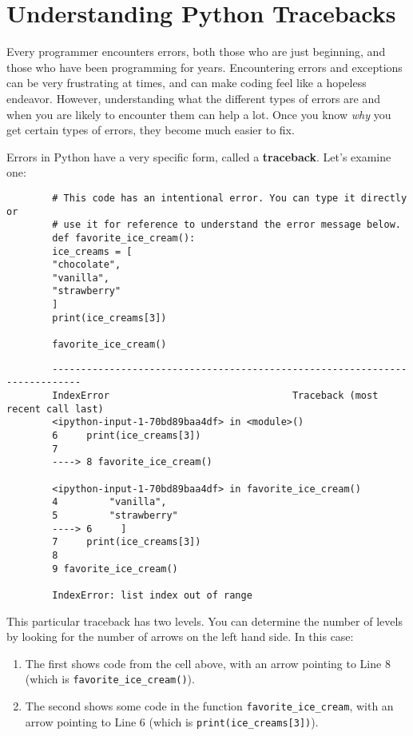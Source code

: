 \documentclass{article}
\begin{document}
	
	\section{Understanding Python Tracebacks}
	
	Every programmer encounters errors, both those who are just beginning, and those who have been programming for years. Encountering errors and exceptions can be very frustrating at times, and can make coding feel like a hopeless endeavor. However, understanding what the different types of errors are and when you are likely to encounter them can help a lot. Once you know \textit{why} you get certain types of errors, they become much easier to fix.
	
	Errors in Python have a very specific form, called a \textbf{traceback}. Let's examine one:
	
	\begin{verbatim}
		# This code has an intentional error. You can type it directly or
		# use it for reference to understand the error message below.
		def favorite_ice_cream():
		ice_creams = [
		"chocolate",
		"vanilla",
		"strawberry"
		]
		print(ice_creams[3])
		
		favorite_ice_cream()
	\end{verbatim}
	
	\begin{verbatim}
		---------------------------------------------------------------------------
		IndexError                                Traceback (most recent call last)
		<ipython-input-1-70bd89baa4df> in <module>()
		6     print(ice_creams[3])
		7
		----> 8 favorite_ice_cream()
		
		<ipython-input-1-70bd89baa4df> in favorite_ice_cream()
		4         "vanilla",
		5         "strawberry"
		----> 6     ]
		7     print(ice_creams[3])
		8
		9 favorite_ice_cream()
		
		IndexError: list index out of range
	\end{verbatim}
	
	This particular traceback has two levels. You can determine the number of levels by looking for the number of arrows on the left hand side. In this case:
	
	\begin{enumerate}
		\item The first shows code from the cell above, with an arrow pointing to Line 8 (which is \texttt{favorite\_ice\_cream()}).
		\item The second shows some code in the function \texttt{favorite\_ice\_cream}, with an arrow pointing to Line 6 (which is \texttt{print(ice\_creams[3])}).
	\end{enumerate}
	
\end{document}
